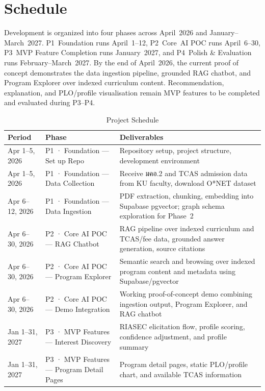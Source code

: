 \section{Schedule}
\label{section:schedule}

Development is organized into four phases across April~2026 and January--March~2027. P1~Foundation runs April~1--12, P2~Core~AI POC runs April~6--30, P3~MVP Feature Completion runs January~2027, and P4~Polish \& Evaluation runs February--March~2027. By the end of April~2026, the current proof of concept demonstrates the data ingestion pipeline, grounded RAG chatbot, and Program Explorer over indexed curriculum content. Recommendation, explanation, and PLO/profile visualisation remain MVP features to be completed and evaluated during P3--P4.

\begin{table}[htbp]
\centering
\footnotesize
\renewcommand{\arraystretch}{1.4}
\caption{Project Schedule}
\label{tab:schedule}
\begin{tabularx}{\textwidth}{|L{3cm}|L{3.2cm}|Y|}
\hline
\textbf{Period} & \textbf{Phase} & \textbf{Deliverables} \\
\hline
Apr 1--5, 2026 & P1 · Foundation — Set up Repo & Repository setup, project structure, development environment \\
\hline
Apr 1--5, 2026 & P1 · Foundation — Data Collection & Receive มคอ.2 and TCAS admission data from KU faculty, download O*NET dataset \\
\hline
Apr 6--12, 2026 & P1 · Foundation — Data Ingestion & PDF extraction, chunking, embedding into Supabase pgvector; graph schema exploration for Phase~2 \\
\hline
Apr 6--30, 2026 & P2 · Core AI POC — RAG Chatbot & RAG pipeline over indexed curriculum and TCAS/fee data, grounded answer generation, source citations \\
\hline
Apr 6--30, 2026 & P2 · Core AI POC — Program Explorer & Semantic search and browsing over indexed program content and metadata using Supabase/pgvector \\
\hline
Apr 6--30, 2026 & P2 · Core AI POC — Demo Integration & Working proof-of-concept demo combining ingestion output, Program Explorer, and RAG chatbot \\
\hline
Jan 1--31, 2027 & P3 · MVP Features — Interest Discovery & RIASEC elicitation flow, profile scoring, confidence adjustment, and profile summary \\
\hline
Jan 1--31, 2027 & P3 · MVP Features — Program Detail Pages & Program detail pages, static PLO/profile chart, and available TCAS information \\

\end{tabularx}
\end{table}
